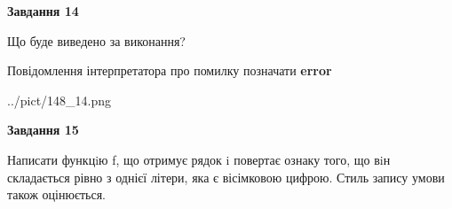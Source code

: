 \documentclass[11pt, ukrainian]{article}
\begin{document}
{\begin {large}
{\begin {center}\textbf{Завдання 14}\end {center}}\par
Що буде виведено за виконання? \par
Повідомлення інтерпретатора про помилку позначати \textbf{error}

\begin{center}
	{../pict/148_14.png}
\end{center}
\newpage

{\begin {center}\textbf{Завдання 15}\end {center}}\par

Написати функцiю f, що отримує рядок i повертає ознаку того, що вiн складається рівно з однієї літери, яка є вісімковою цифрою. Стиль запису умови також оцінюється.\par
\newpage

\end {large}}
\end{document}
